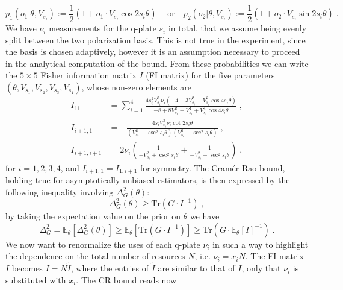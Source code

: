 \documentclass[superscriptaddress,notitlepage,pra]{revtex4-1}
\begin{document}
%
\begin{equation}
    p_1(o_1 | \theta, V_{s_i}) := \frac{1}{2} \left(1 + o_1 \cdot V_{s_i} \cos 2 s_i \theta \right) \; \quad \text{or} \quad p_2(o_2 | \theta, V_{s_i}) := \frac{1}{2} \left( 1 + o_2 \cdot V_{s_i} \sin 2 s_i \theta \right) \; .
\end{equation}
%
We have $\nu_i$ measurements for the q-plate $s_i$ in total, that we assume being evenly split between the two polarization basis. This is not true in the experiment, since the basis is chosen adaptively, however it is an assumption necessary to proceed in the analytical computation of the bound. From these probabilities we can write the $5 \times 5$ Fisher information matrix $I$ (FI matrix) for the five parameters $(\theta, V_{s_1}, V_{s_2}, V_{s_3}, V_{s_4})$, whose non-zero elements are 
%
\begin{align*}
    I_{11} &= \sum_{i=1}^4 \frac{4 s_i^2 V_{s_i}^2 \nu_i \left( -4 + 3 V_{s_i}^2 + V_{s_i}^2 \cos 4 s_i \theta \right)}{-8 + 8 V_{s_i}^2 -V_{s_i}^4 +V_{s_i}^4 \cos 4 s_i \theta} \; ,\\
    I_{i+1, 1} &= -\frac{4 s_i V_{s_i}^3 \nu_i \cot 2 s_i \theta}{(V_{s_i}^2 - \csc ^2 s_i \theta)(V_{s_i}^2 -\sec ^2 s_i \theta)} \; , \\
    I_{i+1, i+1} &= 2 \nu_i \left( \frac{1}{-V_{s_i}^2 + \csc^2 s_i \theta} + \frac{1}{-V_{s_i}^2 + \sec^2 s_i \theta}\right) \; ,
\end{align*}
%
for $i=1, 2, 3, 4$, and $I_{i+1, 1} = I_{1, i+1}$ for symmetry. The Cramér-Rao bound, holding true for asymptotically unbiased estimators, is then expressed by the following inequality involving $\Delta^2_G (\theta)$:
%
\begin{equation}
    \Delta^2_G (\theta) \ge \text{Tr} \left( G \cdot I^{-1} \right) \; ,
\end{equation}
%
by taking the expectation value on the prior on $\theta$ we have
%
\begin{equation}
    \Delta^2_G = \mathbb{E}_\theta [\Delta^2_G (\theta)] \ge \mathbb{E}_\theta [\text{Tr} \left( G \cdot I^{-1} \right)] \ge \text{Tr} \left( G \cdot \mathbb{E}_\theta[I]^{-1} \right) \; .
    \label{eq:cr_bound_minimize}
\end{equation}
%
We now want to renormalize the uses of each q-plate $\nu_i$ in such a way to highlight the dependence on the total number of resources $N$, i.e. $\nu_i = x_i N$. The FI matrix $I$ becomes $I = N \widetilde{I}$, where the entries of $\widetilde{I}$ are similar to that of $I$, only that $\nu_i$ is substituted with $x_i$. The CR bound reads now
\end{document}
